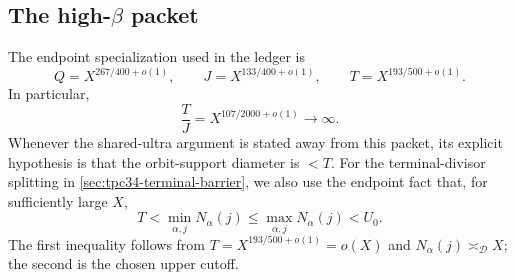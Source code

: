 \subsection{The high-\texorpdfstring{\(\beta\)}{beta} packet}

The endpoint specialization used in the ledger is
\begin{equation}
 Q=X^{267/400+o(1)},\qquad
 J=X^{133/400+o(1)},\qquad
 T=X^{193/500+o(1)}.
 \label{eq:tpc34-high-beta-scales}
\end{equation}
In particular,
\begin{equation}
 \frac TJ=X^{107/2000+o(1)}\longrightarrow\infty.
 \label{eq:tpc34-T-over-J}
\end{equation}
Whenever the shared-ultra argument is stated away from this packet, its
explicit hypothesis is that the orbit-support diameter is \(<T\).
For the terminal-divisor splitting in
\cref{sec:tpc34-terminal-barrier}, we also use the endpoint fact that,
for sufficiently large \(X\),
\begin{equation}
 T<\min_{\alpha,j}N_\alpha(j)
 \le\max_{\alpha,j}N_\alpha(j)<U_0.
 \label{eq:tpc34-terminal-range-condition}
\end{equation}
The first inequality follows from \(T=X^{193/500+o(1)}=o(X)\) and
\(N_\alpha(j)\asymp_{\mathscr D}X\); the second is the chosen upper
cutoff.
